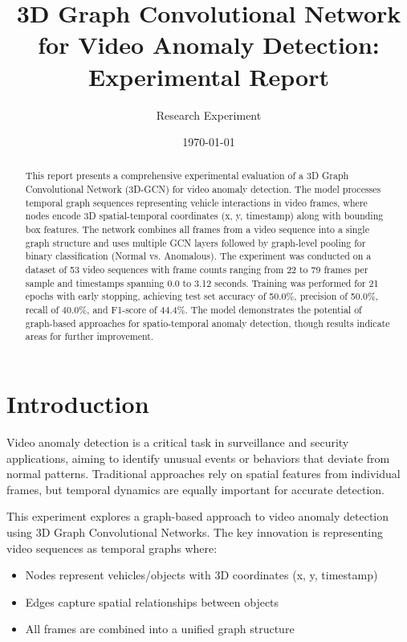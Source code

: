 \documentclass[11pt,a4paper]{article}
\title{\textbf{3D Graph Convolutional Network for Video Anomaly Detection: \\ Experimental Report}}
\author{Research Experiment}
\date{\today}
\begin{document}
\maketitle

\begin{abstract}
This report presents a comprehensive experimental evaluation of a 3D Graph Convolutional Network (3D-GCN) for video anomaly detection. The model processes temporal graph sequences representing vehicle interactions in video frames, where nodes encode 3D spatial-temporal coordinates (x, y, timestamp) along with bounding box features. The network combines all frames from a video sequence into a single graph structure and uses multiple GCN layers followed by graph-level pooling for binary classification (Normal vs. Anomalous). The experiment was conducted on a dataset of 53 video sequences with frame counts ranging from 22 to 79 frames per sample and timestamps spanning 0.0 to 3.12 seconds. Training was performed for 21 epochs with early stopping, achieving test set accuracy of 50.0\%, precision of 50.0\%, recall of 40.0\%, and F1-score of 44.4\%. The model demonstrates the potential of graph-based approaches for spatio-temporal anomaly detection, though results indicate areas for further improvement.
\end{abstract}

\tableofcontents
\newpage

\section{Introduction}

Video anomaly detection is a critical task in surveillance and security applications, aiming to identify unusual events or behaviors that deviate from normal patterns. Traditional approaches rely on spatial features from individual frames, but temporal dynamics are equally important for accurate detection.

This experiment explores a graph-based approach to video anomaly detection using 3D Graph Convolutional Networks. The key innovation is representing video sequences as temporal graphs where:
\begin{itemize}
    \item Nodes represent vehicles/objects with 3D coordinates (x, y, timestamp)
    \item Edges capture spatial relationships between objects
    \item All frames are combined into a unified graph structure
\end{itemize}
\end{document}
